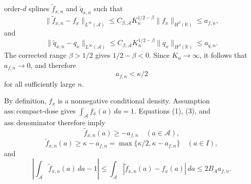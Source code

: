 order-\(d\) splines \(\widetilde f_{x,n}\) and
\(\widetilde q_{x,n}\) such that
\[
 \|\widetilde f_{x,n}-f_x\|_{L^\infty(\mathcal A)}
 \le C_{\beta,\mathcal A}K_n^{1/2-\beta}
       \|f_x\|_{H^\beta(\mathbb R)}
 \le a_{f,n},                                                       \tag{1}
\]
and
\[
 \|\widetilde q_{x,n}-q_x\|_{L^\infty(\mathcal A)}
 \le C_{\beta,\mathcal A}K_n^{1/2-\beta}
       \|q_x\|_{H^\beta(\mathbb R)}
 \le a_{q,n}.                                                       \tag{2}
\]
The corrected range \(\beta>1/2\) gives \(1/2-\beta<0\).  Since
\(K_n\to\infty\), it follows that \(a_{f,n}\to0\), and therefore
\[
 a_{f,n}<\kappa/2                                                     \tag{3}
\]
for all sufficiently large \(n\).

By definition, \(f_x\) is a nonnegative conditional density.  Assumption
\(\mathrm{ass{:}compact\text{-}dose}\) gives
\(\int_{\mathcal A}f_x(a)\,da=1\).  Equations (1), (3), and
\(\mathrm{ass{:}denominator}\) therefore imply
\[
 \widetilde f_{x,n}(a)\ge-a_{f,n}\quad(a\in\mathcal A),            \tag{4}
\]
\[
 \widetilde f_{x,n}(a)\ge\kappa-a_{f,n}
 =\max\{\kappa/2,\kappa-a_{f,n}\}\quad(a\in I),                   \tag{5}
\]
and
\[
 \left|\int_{\mathcal A}\widetilde f_{x,n}(a)\,da-1\right|
 \le\int_{\mathcal A}|\widetilde f_{x,n}(a)-f_x(a)|\,da
 \le2B_Aa_{f,n}.                                                    \tag{6}
\]

